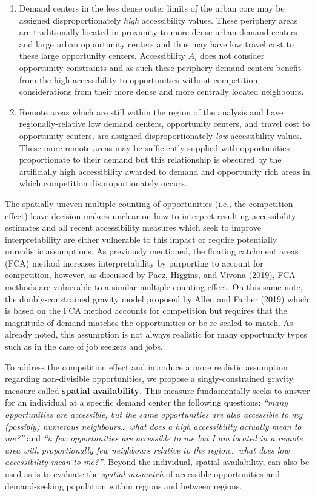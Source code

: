 \documentclass[]{elsarticle} %
\begin{document}
\begin{enumerate}
\def\labelenumi{\arabic{enumi})}
\item
  Demand centers in the less dense outer limits of the urban core may be
  assigned disproportionately \emph{high} accessibility values. These
  periphery areas are traditionally located in proximity to more dense
  urban demand centers and large urban opportunity centers and thus may
  have low travel cost to these large opportunity centers. Accessibility
  \(A_i\) does not consider opportunity-constraints and as such these
  periphery demand centers benefit from the high accessibility to
  opportunities without competition considerations from their more dense
  and more centrally located neighbours.
\item
  Remote areas which are still within the region of the analysis and
  have regionally-relative low demand centers, opportunity centers, and
  travel cost to opportunity centers, are assigned disproportionately
  \emph{low} accessibility values. These more remote areas may be
  sufficiently supplied with opportunities proportionate to their demand
  but this relationship is obscured by the artificially high
  accessibility awarded to demand and opportunity rich areas in which
  competition disproportionately occurs.
\end{enumerate}

The spatially uneven multiple-counting of opportunities (i.e., the
competition effect) leave decision makers unclear on how to interpret
resulting accessibility estimates and all recent accessibility measures
which seek to improve interpretability are either vulnerable to this
impact or require potentially unrealistic assumptions. As previously
mentioned, the floating catchment areas (FCA) method increases
interpretability by purporting to account for competition, however, as
discussed by Paez, Higgins, and Vivona (2019), FCA methods are
vulnerable to a similar multiple-counting effect. On this same note, the
doubly-constrained gravity model proposed by Allen and Farber (2019)
which is based on the FCA method accounts for competition but requires
that the magnitude of demand matches the opportunities or be re-scaled
to match. As already noted, this assumption is not always realistic for
many opportunity types such as in the case of job seekers and jobs.

To address the competition effect and introduce a more realistic
assumption regarding non-divisible opportunities, we propose a
singly-constrained gravity measure called \textbf{spatial availability}.
This measure fundamentally seeks to answer for an individual at a
specific demand center the following questions: \emph{``many
opportunities are accessible, but the same opportunities are also
accessible to my (possibly) numerous neighbours\ldots{} what does a high
accessibility actually mean to me?''} and \emph{``a few opportunities
are accessible to me but I am located in a remote area with
proportionally few neighbours relative to the region\ldots{} what does
low accessibility mean to me?''}. Beyond the individual, spatial
availability, can also be used as-is to evaluate the \emph{spatial
mismatch} of accessible opportunities and demand-seeking population
within regions and between regions.
\end{document}
